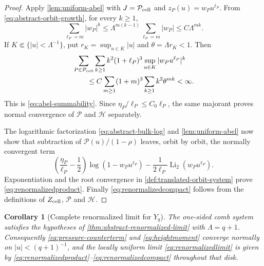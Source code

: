 \documentclass[11pt,reqno]{amsart}
\numberwithin{equation}{section}
\newtheorem{corollary}[theorem]{Corollary}
\theoremstyle{definition}
\theoremstyle{remark}
\newcommand{\Li}{\operatorname{Li}_2}
\begin{document}
\begin{proof}
Apply \cref{lem:uniform-abel} with
$J=\mathcal P_{\rm cell}$ and $z_P(u)=w_Pu^{\ell_P}$.  From
\eqref{eq:abstract-orbit-growth}, for every $k\ge1$,
\begin{equation}\label{eq:abstract-power-bound}
 \sum_{\ell_P=m}|w_P|^k
 \le\Lambda^{m(k-1)}
 \sum_{\ell_P=m}|w_P|
 \le C\Lambda^{mk}.
\end{equation}
If $K\Subset\{|u|<\Lambda^{-1}\}$, put
$r_K=\sup_{u\in K}|u|$ and $\theta=\Lambda r_K<1$.  Then
\begin{align*}
 &\sum_{P\in\mathcal P_{\rm cell}}\sum_{k\ge1}
 k^2(1+\ell_P)^3\sup_{u\in K}|w_Pu^{\ell_P}|^k\\
 &\qquad\le
 C\sum_{m\ge1}(1+m)^3\sum_{k\ge1}k^2\theta^{mk}<\infty.
\end{align*}
This is \eqref{eq:abel-summability}.  Since
$\eta_P/\ell_P\le C_0\ell_P$, the same majorant proves normal convergence of
$\mathscr P$ and $\mathscr H$ separately.

The logarithmic factorization \eqref{eq:abstract-bulk-log} and
\cref{lem:uniform-abel} now show that subtraction of
$\mathscr P(u)/(1-\rho)$ leaves, orbit by orbit, the normally convergent term
\begin{equation}\label{eq:finite-per-orbit}
 \left(\frac{\eta_P}{\ell_P}-\frac12\right)
 \log(1-w_Pu^{\ell_P})
 -\frac1{2\ell_P}\Li(w_Pu^{\ell_P}).
\end{equation}
Exponentiation and the root convergence in
\cref{def:translated-orbit-system} prove \eqref{eq:renormalizedproduct}.
Finally
\eqref{eq:renormalizedcompact} follows from the definitions of
$Z_{\rm cell}$, $\mathscr P$ and $\mathscr H$.
\end{proof}

\begin{corollary}[Complete renormalized limit for $Y_q$]
\label{thm:renormalizedlimit}
The one-sided comb system satisfies the hypotheses of
\cref{thm:abstract-renormalized-limit} with $\Lambda=q+1$.  Consequently
\eqref{eq:pressure-counterterm} and \eqref{eq:heightmoment} converge normally
on $|u|<(q+1)^{-1}$, and the locally uniform limit
\eqref{eq:renormalizedlimit} is given by
\eqref{eq:renormalizedproduct}--\eqref{eq:renormalizedcompact} throughout
that disk.
\end{corollary}
\end{document}
